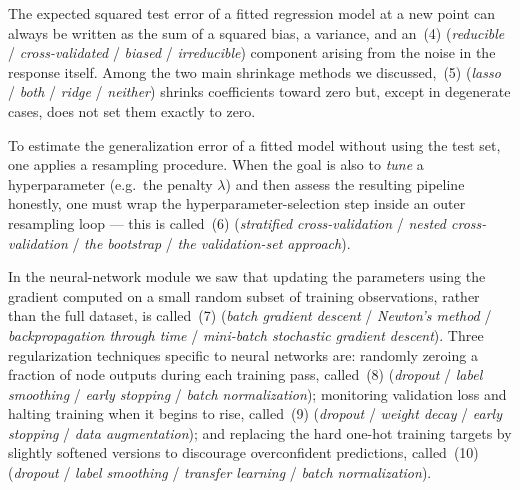 \documentclass[11pt,a4paper]{article}
\begin{document}
The expected squared test error of a fitted regression model at a new point can always be written as the sum of a squared bias, a variance, and an \underline{\hspace{2.5cm}}\,(4) (\emph{reducible} / \emph{cross-validated} / \emph{biased} / \emph{irreducible}) component arising from the noise in the response itself. Among the two main shrinkage methods we discussed, \underline{\hspace{2.5cm}}\,(5) (\emph{lasso} / \emph{both} / \emph{ridge} / \emph{neither}) shrinks coefficients toward zero but, except in degenerate cases, does not set them exactly to zero.

To estimate the generalization error of a fitted model without using the test set, one applies a resampling procedure. When the goal is also to \emph{tune} a hyperparameter (e.g.\ the penalty $\lambda$) and then assess the resulting pipeline honestly, one must wrap the hyperparameter-selection step inside an outer resampling loop --- this is called \underline{\hspace{2.5cm}}\,(6) (\emph{stratified cross-validation} / \emph{nested cross-validation} / \emph{the bootstrap} / \emph{the validation-set approach}).

In the neural-network module we saw that updating the parameters using the gradient computed on a small random subset of training observations, rather than the full dataset, is called \underline{\hspace{2.5cm}}\,(7) (\emph{batch gradient descent} / \emph{Newton's method} / \emph{backpropagation through time} / \emph{mini-batch stochastic gradient descent}). Three regularization techniques specific to neural networks are: randomly zeroing a fraction of node outputs during each training pass, called \underline{\hspace{2.5cm}}\,(8) (\emph{dropout} / \emph{label smoothing} / \emph{early stopping} / \emph{batch normalization}); monitoring validation loss and halting training when it begins to rise, called \underline{\hspace{2.5cm}}\,(9) (\emph{dropout} / \emph{weight decay} / \emph{early stopping} / \emph{data augmentation}); and replacing the hard one-hot training targets by slightly softened versions to discourage overconfident predictions, called \underline{\hspace{2.5cm}}\,(10) (\emph{dropout} / \emph{label smoothing} / \emph{transfer learning} / \emph{batch normalization}).

\vfill\eject
\end{document}
